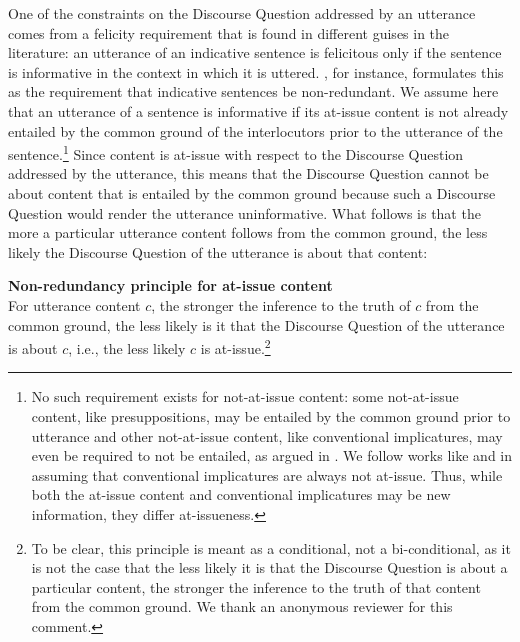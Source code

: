 \documentclass[11pt,fleqn]{article}
\newcommand{\6}{\mbox{$[\hspace*{-.6mm}[$}}
\newcommand{\9}{\mbox{$]\hspace*{-.6mm}]$}}
\begin{document}
One of the constraints on the Discourse Question addressed by an utterance comes from a felicity requirement that is found in different guises in the literature: an utterance of an indicative sentence is felicitous only if the sentence is informative in the context in which it is uttered. \citet[144]{groenendijk1999}, for instance, formulates this as the requirement that indicative sentences be non-redundant. We assume here that an utterance of a sentence is informative if its at-issue content is not already entailed by the common ground of the interlocutors prior to the utterance of the sentence.\footnote{No such requirement exists for not-at-issue content: some not-at-issue content, like presuppositions, may be entailed by the common ground prior to utterance and other not-at-issue content, like conventional implicatures, may even be required to not be entailed, as argued in \citealt{potts05}. We follow works like \citealt{potts05} and \citealt{murray2014} in assuming that conventional implicatures are always not at-issue. Thus, while both the at-issue content and conventional implicatures may be new information, they differ at-issueness.} Since content is at-issue with respect to the Discourse Question addressed by the utterance, this means that the Discourse Question cannot be about content that is entailed by the common ground because such a Discourse Question would render the utterance uninformative. What follows is that the more a particular utterance content follows from the common ground, the less likely the Discourse Question of the utterance is about that content:
%
% 
%
%
\begin{exe}

\ex\label{principle} {\bf Non-redundancy principle for at-issue content} \\ For utterance content $c$, the stronger the inference to the truth of $c$ from the common ground, the less likely is it that the Discourse Question of the utterance is about $c$, i.e., the less likely $c$ is at-issue.\footnote{To be clear, this principle is meant as a conditional, not a bi-conditional, as it is not the case that the less likely it is that the Discourse Question is about a particular content, the stronger the inference to the truth of that content from the common ground. We thank an anonymous reviewer for this comment.}

\end{exe}
\end{document}
